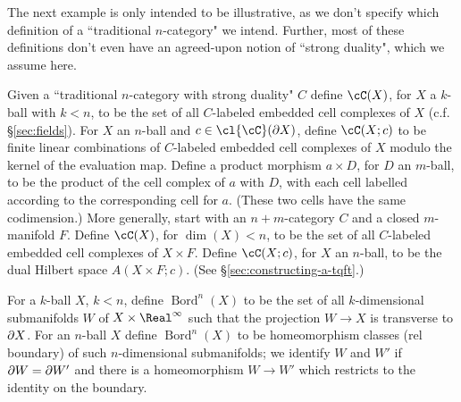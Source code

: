 The next example is only intended to be illustrative, as we don't specify 
which definition of a ``traditional $n$-category" we intend.
Further, most of these definitions don't even have an agreed-upon notion of 
``strong duality", which we assume here.
\begin{example}
\rm
\label{ex:traditional-n-categories}
Given a ``traditional $n$-category with strong duality" $C$
define $\cC(X)$, for $X$ a $k$-ball with $k < n$,
to be the set of all $C$-labeled embedded cell complexes of $X$ (c.f. \S \ref{sec:fields}).
For $X$ an $n$-ball and $c\in \cl{\cC}(\bd X)$, define $\cC(X; c)$ to be finite linear
combinations of $C$-labeled embedded cell complexes of $X$
modulo the kernel of the evaluation map.
Define a product morphism $a\times D$, for $D$ an $m$-ball, to be the product of the cell complex of $a$ with $D$,
with each cell labelled according to the corresponding cell for $a$.
(These two cells have the same codimension.)
More generally, start with an $n{+}m$-category $C$ and a closed $m$-manifold $F$.
Define $\cC(X)$, for $\dim(X) < n$,
to be the set of all $C$-labeled embedded cell complexes of $X\times F$.
Define $\cC(X; c)$, for $X$ an $n$-ball,
to be the dual Hilbert space $A(X\times F; c)$.
(See \S\ref{sec:constructing-a-tqft}.)
\end{example}



\newcommand{\Bord}{\operatorname{Bord}}
\begin{example}
\label{ex:bord-cat}
\rm
\label{ex:bordism-category}
For a $k$-ball $X$, $k<n$, define $\Bord^n(X)$ to be the set of all $k$-dimensional
submanifolds $W$ of $X\times \Real^\infty$ such that the projection $W \to X$ is transverse
to $\partial X$.
For an $n$-ball $X$ define $\Bord^n(X)$ to be homeomorphism classes (rel boundary) of such $n$-dimensional submanifolds;
we identify $W$ and $W'$ if $\partial W = \partial W'$ and there is a homeomorphism
$W \to W'$ which restricts to the identity on the boundary.
\end{example}

